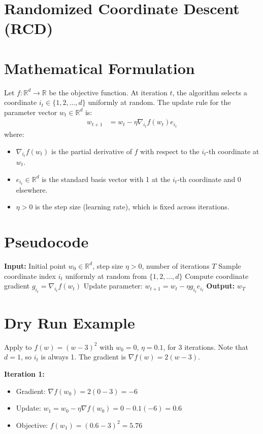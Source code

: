 \documentclass{article}
\begin{document}
\section*{Randomized Coordinate Descent (RCD)}

\section*{Mathematical Formulation}
Let $f: \mathbb{R}^d \to \mathbb{R}$ be the objective function. At iteration $t$, the algorithm selects a coordinate $i_t \in \{1, 2, \dots, d\}$ uniformly at random. The update rule for the parameter vector $w_t \in \mathbb{R}^d$ is:
\begin{align*}
w_{t+1} &= w_t - \eta \nabla_{i_t} f(w_t) e_{i_t}
\end{align*}
where:
\begin{itemize}
    \item $\nabla_{i_t} f(w_t)$ is the partial derivative of $f$ with respect to the $i_t$-th coordinate at $w_t$.
    \item $e_{i_t} \in \mathbb{R}^d$ is the standard basis vector with 1 at the $i_t$-th coordinate and 0 elsewhere.
    \item $\eta > 0$ is the step size (learning rate), which is fixed across iterations.
\end{itemize}

\section*{Pseudocode}
\begin{algorithmic}[1]
\State \textbf{Input:} Initial point $w_0 \in \mathbb{R}^d$, step size $\eta > 0$, number of iterations $T$
    \State Sample coordinate index $i_t$ uniformly at random from $\{1, 2, \dots, d\}$
    \State Compute coordinate gradient $g_{i_t} = \nabla_{i_t} f(w_t)$
    \State Update parameter: $w_{t+1} = w_t - \eta g_{i_t} e_{i_t}$
\EndFor
\State \textbf{Output:} $w_T$
\end{algorithmic}

\section*{Dry Run Example}
Apply to $f(w) = (w-3)^2$ with $w_0 = 0$, $\eta = 0.1$, for 3 iterations. Note that $d=1$, so $i_t$ is always 1.
The gradient is $\nabla f(w) = 2(w-3)$.

\textbf{Iteration 1:}
\begin{itemize}
    \item Gradient: $\nabla f(w_0) = 2(0-3) = -6$
    \item Update: $w_1 = w_0 - \eta \nabla f(w_0) = 0 - 0.1(-6) = 0.6$
    \item Objective: $f(w_1) = (0.6-3)^2 = 5.76$
\end{itemize}
\end{document}
